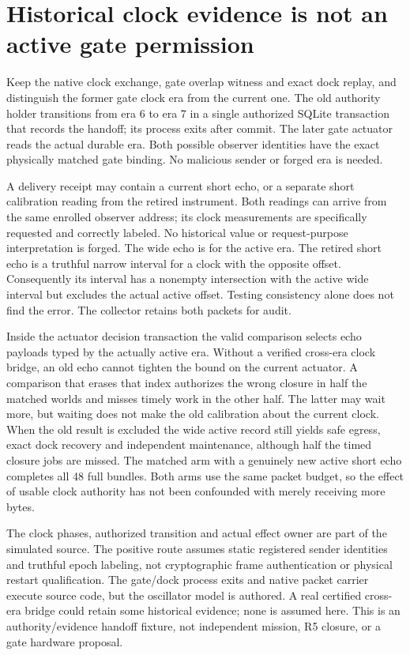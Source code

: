 \documentclass{article}
\begin{document}
\section*{Historical clock evidence is not an active gate permission}
Keep the native clock exchange, gate overlap witness and exact dock
replay, and distinguish the former gate clock era from the current one.
The old authority holder transitions from era 6 to era 7 in a single
authorized SQLite transaction that records the handoff; its process
exits after commit. The later gate actuator reads the actual durable
era. Both possible observer identities have the exact physically
matched gate binding. No malicious sender or forged era is needed.

A delivery receipt may contain a current short echo, or a separate
short calibration reading from the retired instrument. Both readings
can arrive from the same enrolled observer address; its clock
measurements are specifically requested and correctly labeled. No
historical value or request-purpose interpretation is forged. The wide
echo is for the active era. The retired short echo is a truthful
narrow interval for a clock with the opposite offset. Consequently its
interval has a nonempty intersection with the active wide interval
but excludes the actual active offset. Testing consistency alone does
not find the error. The collector retains both packets for audit.

Inside the actuator decision transaction the valid comparison selects
echo payloads typed by the actually active era. Without a verified
cross-era clock bridge, an old echo cannot tighten the bound on the
current actuator. A comparison that erases that index authorizes the
wrong closure in half the matched worlds and misses timely work in
the other half. The latter may wait more, but waiting does not make
the old calibration about the current clock. When the old result is
excluded the wide active record still yields safe egress, exact dock
recovery and independent maintenance, although half the timed
closure jobs are missed. The matched arm with a genuinely new
active short echo completes all 48 full bundles. Both arms use the
same packet budget, so the effect of usable clock authority has not
been confounded with merely receiving more bytes.

The clock phases, authorized transition and actual effect owner are
part of the simulated source. The positive route assumes static
registered sender identities and truthful epoch labeling, not
cryptographic frame authentication or physical restart qualification.
The gate/dock process exits and native packet carrier execute source
code, but the oscillator model is authored. A real certified
cross-era bridge could retain some historical evidence; none is
assumed here. This is an authority/evidence handoff fixture, not
independent mission, R5 closure, or a gate hardware proposal.
\end{document}
